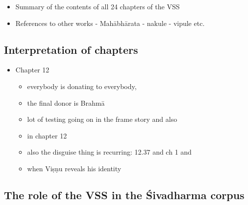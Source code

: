 \documentclass[11pt]{book}
\begin{document}
\begin{itemize}

\item
  Summary of the contents of all 24 chapters of the VSS
\item
  References to other works - Mahābhārata - nakule - vipule etc.
\end{itemize}



\subsection{Interpretation of chapters}

\begin{itemize}

\item
  Chapter 12

  \begin{itemize}
  
  \item
    everybody is donating to everybody,
  \item
    the final donor is Brahmā
  \item
    lot of testing going on in the frame story and also
  \item
    in chapter 12
  \item
    also the disguise thing is recurring: 12.37 and ch 1 and
  \item
    when Viṣṇu reveals his identity
  \end{itemize}
\end{itemize}









\subsection{The role of the VSS in the Śivadharma corpus}
\end{document}
